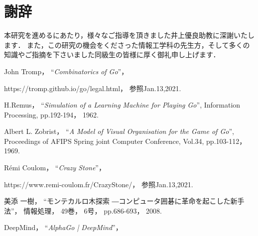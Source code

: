 \documentclass[openright]{nitocs}
\numberwithin{equation}{section}
\begin{document}
    \section*{謝辞} %
        本研究を進めるにあたり，様々なご指導を頂きました井上優良助教に深謝いたします．
        また，この研究の機会をくださった情報工学科の先生方，そして多くの知識やご指摘を下さいました同級生の皆様に厚く御礼申し上げます．
    
    \begin{thebibliography}{10} %


        John Tromp，
        ``{\it Combinatorics of Go}''，

        https://tromp.github.io/go/legal.html，
        参照Jan.13,2021.

        H.Remus，
        ``{\it Simulation of a Learning Machine for Playing Go}'', 
        Information Processing, 
        pp.192-194，
        1962. 

        Albert L. Zobrist，
        ``{\it A Model of Visual Organisation for the Game of Go}'', 
        Proceedings of AFIPS Spring joint Computer Conference, 
        Vol.34, 
        pp.103-112，
        1969. 

        Rémi Coulom，
        ``{\it Crazy Stone}''，

        https://www.remi-coulom.fr/CrazyStone/，
        参照Jan.13,2021.

        美添 一樹，
        ``モンテカルロ木探索 ―コンピュータ囲碁に革命を起こした新手法''，
        情報処理，
        49巻，
        6号，
        pp.686-693，
        2008.

        DeepMind，
        ``{\it AlphaGo | DeepMind}''，


\end{thebibliography}
\end{document}
